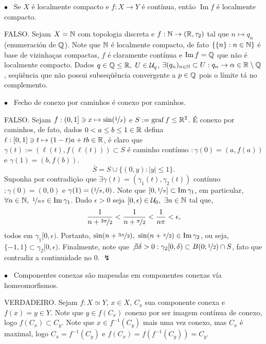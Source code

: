 \(\bullet\) \ Se \(X\) é localmente compacto e \(f:X\to Y\) é contínua, então \(\operatorname{Im} f \) é localmente compacto. 

\textcolor{gris}{FALSO. Sejam \(X = \mathbb{N}\) com topologia discreta e \(f: \mathbb{N} \to (\mathbb{R}, \tau_2)\) tal que \(n\mapsto q_n\) (enumeración de \(\mathbb{Q}\)). Note que \(\mathbb{N}\) é localmente compacto, de fato \(\{\{n \}: n \in \mathbb{N}\}\) é base de vizinhaças compactas,  \(f \) é claramente contínua e \(\operatorname{Im}f = \mathbb{Q}\) que não é localmente compacto. Dados \(q \in \mathbb{Q} \leq \mathbb{R},\ U \in \mathcal{U}_q\), \(\exists (q_n)_{n\in \mathbb{N}}\subset U : q_n\to \alpha \in \mathbb{R}\setminus \mathbb{Q}\), seqüência que não possui subseqüência convergente a \(p \in \mathbb{Q}\) pois o límite tá no complemento. }

\( \bullet \) \ Fecho de conexo por caminhos é conexo por caminhos. 

\textcolor{gris}{
  FALSO. Sejam \(f: (0,1] \ni x \mapsto \sin( \nicefrac{1}{x}) \) e \(S := \operatorname{graf}f \leq \mathbb{R}^2\). É conexo por caminhos, de fato, dados \(0< a \leq b \leq 1 \in \mathbb{R}\) defina \(\ell: [0,1] \ni t \mapsto (1-t)a + tb \in  \mathbb{R}\), é claro que \(\gamma(t):= (\ell(t), f(\ell(t)))\subset S\) é caminho contínuo \(: \gamma(0) = (a, f(a)) \) e \(\gamma(1) = (b, f(b))\). 
  \[\overline{S} = S \cup \{(0,y): |y|\leq 1\}. \]
  Suponha por contradição que \(\exists \gamma(t) = (\gamma_1(t), \gamma_2(t))\) contínuo \(: \gamma(0) = (0,0)\) e \(\gamma(1) = (\nicefrac{1}{\pi}, 0)\). Note que \([0,\nicefrac{1}{\pi}]\subset \operatorname{Im}\gamma_1\), em particular, \(\forall n \in \mathbb{N}, \ \nicefrac{1}{n\pi}\in \operatorname{Im}\gamma_1\). Dado \(\epsilon > 0\) seja \([0,\epsilon) \in \mathcal{U}_0, \ \exists n \in \mathbb{N}  \) tal que,
  \[\frac{1}{n+\nicefrac{3\pi}{2}}< \frac{1}{n+\nicefrac{\pi}{2}} < \frac{1}{n\pi}< \epsilon,\]  
  todos em \(\gamma_1[0,\epsilon)\). Portanto, \(\sin(n+\nicefrac{3\pi}{2}), \ \sin(n + \nicefrac{\pi}{2}) \in \operatorname{Im}\gamma_2\), ou seja, \(\{-1,1 \}\subset \gamma_2[0,\epsilon)\). Finalmente, note que \(\not\exists \delta>0 : \gamma_2[0, \delta) \subset B(0;\nicefrac{1}{2}) \cap S\), fato que contradiz a continuidade no 0. \(\lightning\)  
}

\(\bullet \) \ Componentes conexas são mapeadas em componentes conexas vía homeomorfismos. 

\textcolor{gris}{VERDADEIRO. Sejam \(f:X\simeq Y\), \(x\in X\), \(C_x\) sua componente conexa e \(f(x)= y \in Y\). Note que \(y \in f(C_x)\) conexo por ser imagem contínua de conexo, logo \(f(C_x)\subset C_y\). Note que \(x \in f^{-1}(C_y)\) mais uma vez conexo, mas \(C_x \) é maximal, logo \(C_x = f^{-1}(C_y)\) e \(f(C_x) = f(f^{-1}(C_y)) = C_y\). }

